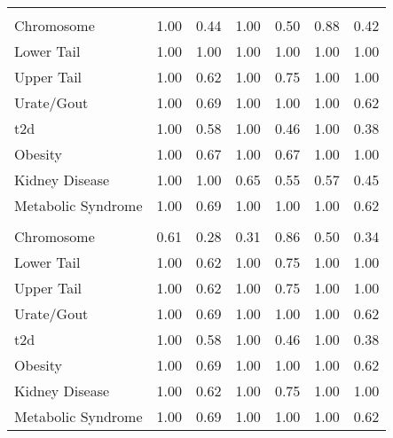 \documentclass[]{report}
\begin{document}
\begin{table}
\begin{tabular}[t]{lllllll}
\addlinespace[0.3em]
\multicolumn{7}{l}{\textbf{Fay and Wu's H}}\\
\hspace{1em}Chromosome & 1.00 & 0.44 & 1.00 & 0.50 & 0.88 & 0.42\\
\hspace{1em}Lower Tail & 1.00 & 1.00 & 1.00 & 1.00 & 1.00 & 1.00\\
\hspace{1em}Upper Tail & 1.00 & 0.62 & 1.00 & 0.75 & 1.00 & \vphantom{2} 1.00\\
\hspace{1em}Urate/Gout & 1.00 & 0.69 & 1.00 & 1.00 & 1.00 & \vphantom{2} 0.62\\
\hspace{1em}\Gls{t2d} & 1.00 & 0.58 & 1.00 & 0.46 & 1.00 & \vphantom{1} 0.38\\
\hspace{1em}Obesity & 1.00 & 0.67 & 1.00 & 0.67 & 1.00 & 1.00\\
\hspace{1em}Kidney Disease & 1.00 & 1.00 & 0.65 & 0.55 & 0.57 & 0.45\\
\hspace{1em}Metabolic Syndrome & 1.00 & 0.69 & 1.00 & 1.00 & 1.00 & \vphantom{2} 0.62\\
\addlinespace[0.3em]
\multicolumn{7}{l}{\textbf{Tajima's D}}\\
\hspace{1em}Chromosome & 0.61 & 0.28 & 0.31 & 0.86 & 0.50 & 0.34\\
\hspace{1em}Lower Tail & 1.00 & 0.62 & 1.00 & 0.75 & 1.00 & \vphantom{1} 1.00\\
\hspace{1em}Upper Tail & 1.00 & 0.62 & 1.00 & 0.75 & 1.00 & \vphantom{1} 1.00\\
\hspace{1em}Urate/Gout & 1.00 & 0.69 & 1.00 & 1.00 & 1.00 & \vphantom{1} 0.62\\
\hspace{1em}\Gls{t2d} & 1.00 & 0.58 & 1.00 & 0.46 & 1.00 & 0.38\\
\hspace{1em}Obesity & 1.00 & 0.69 & 1.00 & 1.00 & 1.00 & 0.62\\
\hspace{1em}Kidney Disease & 1.00 & 0.62 & 1.00 & 0.75 & 1.00 & 1.00\\
\hspace{1em}Metabolic Syndrome & 1.00 & 0.69 & 1.00 & 1.00 & 1.00 & \vphantom{1} 0.62\\

\end{tabular}
\end{table}
\end{document}
